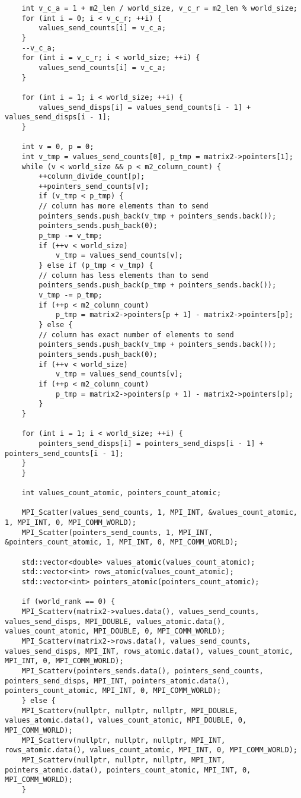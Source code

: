 \documentclass{report}
\begin{document}
\begin{lstlisting}
    int v_c_a = 1 + m2_len / world_size, v_c_r = m2_len % world_size;
    for (int i = 0; i < v_c_r; ++i) {
        values_send_counts[i] = v_c_a;
    }
    --v_c_a;
    for (int i = v_c_r; i < world_size; ++i) {
        values_send_counts[i] = v_c_a;
    }

    for (int i = 1; i < world_size; ++i) {
        values_send_disps[i] = values_send_counts[i - 1] + values_send_disps[i - 1];
    }

    int v = 0, p = 0;
    int v_tmp = values_send_counts[0], p_tmp = matrix2->pointers[1];
    while (v < world_size && p < m2_column_count) {
        ++column_divide_count[p];
        ++pointers_send_counts[v];
        if (v_tmp < p_tmp) {
        // column has more elements than to send
        pointers_sends.push_back(v_tmp + pointers_sends.back());
        pointers_sends.push_back(0);
        p_tmp -= v_tmp;
        if (++v < world_size)
            v_tmp = values_send_counts[v];
        } else if (p_tmp < v_tmp) {
        // column has less elements than to send
        pointers_sends.push_back(p_tmp + pointers_sends.back());
        v_tmp -= p_tmp;
        if (++p < m2_column_count)
            p_tmp = matrix2->pointers[p + 1] - matrix2->pointers[p];
        } else {
        // column has exact number of elements to send
        pointers_sends.push_back(v_tmp + pointers_sends.back());
        pointers_sends.push_back(0);
        if (++v < world_size)
            v_tmp = values_send_counts[v];
        if (++p < m2_column_count)
            p_tmp = matrix2->pointers[p + 1] - matrix2->pointers[p];
        }
    }

    for (int i = 1; i < world_size; ++i) {
        pointers_send_disps[i] = pointers_send_disps[i - 1] + pointers_send_counts[i - 1];
    }
    }

    int values_count_atomic, pointers_count_atomic;

    MPI_Scatter(values_send_counts, 1, MPI_INT, &values_count_atomic, 1, MPI_INT, 0, MPI_COMM_WORLD);
    MPI_Scatter(pointers_send_counts, 1, MPI_INT, &pointers_count_atomic, 1, MPI_INT, 0, MPI_COMM_WORLD);

    std::vector<double> values_atomic(values_count_atomic);
    std::vector<int> rows_atomic(values_count_atomic);
    std::vector<int> pointers_atomic(pointers_count_atomic);

    if (world_rank == 0) {
    MPI_Scatterv(matrix2->values.data(), values_send_counts, values_send_disps, MPI_DOUBLE, values_atomic.data(), values_count_atomic, MPI_DOUBLE, 0, MPI_COMM_WORLD);
    MPI_Scatterv(matrix2->rows.data(), values_send_counts, values_send_disps, MPI_INT, rows_atomic.data(), values_count_atomic, MPI_INT, 0, MPI_COMM_WORLD);
    MPI_Scatterv(pointers_sends.data(), pointers_send_counts, pointers_send_disps, MPI_INT, pointers_atomic.data(), pointers_count_atomic, MPI_INT, 0, MPI_COMM_WORLD);
    } else {
    MPI_Scatterv(nullptr, nullptr, nullptr, MPI_DOUBLE, values_atomic.data(), values_count_atomic, MPI_DOUBLE, 0, MPI_COMM_WORLD);
    MPI_Scatterv(nullptr, nullptr, nullptr, MPI_INT, rows_atomic.data(), values_count_atomic, MPI_INT, 0, MPI_COMM_WORLD);
    MPI_Scatterv(nullptr, nullptr, nullptr, MPI_INT, pointers_atomic.data(), pointers_count_atomic, MPI_INT, 0, MPI_COMM_WORLD);
    }


\end{lstlisting}
\end{document}
